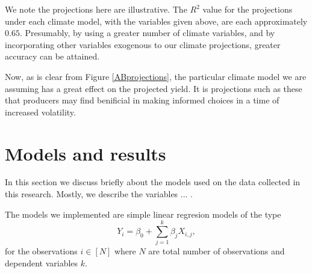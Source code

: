 \documentclass[11pt]{article}
\numberwithin{equation}{section}
\begin{document}
We note the projections here are illustrative. The $R^2$ value for the projections under each climate model, with the variables given above, are each approximately $0.65$. Presumably, by using a greater number of climate variables, and by incorporating other variables exogenous to our climate projections, greater accuracy can be attained.  

Now, as is clear from Figure \ref{ABprojections}, the particular climate model we are assuming has a great effect on the projected yield. It is projections such as these that producers may find benificial in making informed choices in a time of increased volatility.

\section{Models and results}\label{Corr_modl}
In this section we discuss briefly about the models used on the data collected  in this research. Mostly,  we  describe the variables ...  .

The models we implemented are simple  linear regresion models of the type 
\begin{equation}
Y_i = \beta_0 + \sum_{j=1}^k \beta_j X_{i,j},    
\end{equation}
 for the observations $i\in [N]$ where $N$ are total number of observations and  dependent variables $k$.
 
\end{document}
